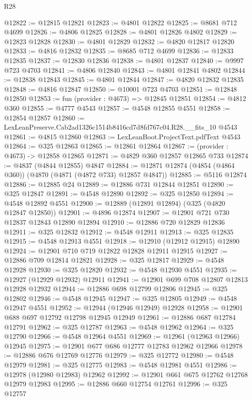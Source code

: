 \begin{lexlean}{R28}
\begin{coremodule}
@12822 := @12815 @12821
@12823 := @4801 @12822
@12825 := @8681 @712 @4699
@12826 := @4806 @12825
@12828 := @4801 @12826 @4802
@12829 := @12823 @12828
@12830 := @4801 @12829
@12832 := @4820 @12817 @12820
@12833 := @4816 @12832
@12835 := @8685 @712 @4699
@12836 := @12833 @12835
@12837 := @12830 @12836
@12838 := @4801 @12837
@12840 := @9997 @723 @4703
@12841 := @4806 @12840
@12843 := @4801 @12841 @4802
@12844 := @12838 @12843
@12845 := @4801 @12844
@12847 := @4820 @12832 @12835
@12848 := @4816 @12847
@12850 := @10001 @723 @4703
@12851 := @12848 @12850
@12853 := fun (provider : @4673) => @12845 @12851
@12854 := @4812 @360
@12855 := @4777 @4543
@12857 := @4548 @12855 @4551
@12858 := @12854 @12857
@12860 := LexLeanPreserve.Cab2ad1326c1514b8416cd7d8fd767c04.R28.__fits_10 @4543
@12861 := @4815 @12860
@12863 := LexLeanBoot.ProjectText.pdfText @4543
@12864 := @325 @12863
@12865 := @12861 @12864
@12867 := (provider : @4673) -> @12858 @12865
@12871 := @4829 @360 @12857 @12865 @733
@12874 := @4837 (@4844 @12855) @4847
@12884 := @12871 @12874 (@4854 (@4864 @360)) (@4870 (@4871 (@4872 @733) @12857 @4847))
@12885 := @5116 @12874
@12886 := @12885 @24
@12889 := @12886 @731 @12844 @12851
@12890 := @325 @12847
@12891 := @4548 @12890
@12892 := @325 @12850
@12894 := @4548 @12892 @4551
@12900 := @12889 (@12891 @12894) (@325 (@4820 @12847 @12850))
@12901 := @4896 @12874
@12907 := @12901 @721 @730 @12837 @12843 @12890 @12894
@12910 := @12886 @720 @12829 @12836
@12911 := @325 @12832
@12912 := @4548 @12911
@12913 := @325 @12835
@12915 := @4548 @12913 @4551
@12918 := @12910 (@12912 @12915) @12890
@12924 := @12901 @710 @719 @12822 @12828 @12911 @12915
@12927 := @12886 @709 @12814 @12821
@12928 := @325 @12817
@12929 := @4548 @12928
@12930 := @325 @12820
@12932 := @4548 @12930 @4551
@12935 := @12927 (@12929 @12932) @12911
@12941 := @12901 @699 @708 @12807 @12813 @12928 @12932
@12944 := @12886 @698 @12799 @12806
@12945 := @325 @12802
@12946 := @4548 @12945
@12947 := @325 @12805
@12949 := @4548 @12947 @4551
@12952 := @12944 (@12946 @12949) @12928
@12958 := @12901 @688 @697 @12792 @12798 @12945 @12949
@12961 := @12886 @687 @12784 @12791
@12962 := @325 @12787
@12963 := @4548 @12962
@12964 := @325 @12790
@12966 := @4548 @12964 @4551
@12969 := @12961 (@12963 @12966) @12945
@12975 := @12901 @677 @686 @12777 @12783 @12962 @12966
@12978 := @12886 @676 @12769 @12776
@12979 := @325 @12772
@12980 := @4548 @12979
@12981 := @325 @12775
@12983 := @4548 @12981 @4551
@12986 := @12978 (@12980 @12983) @12962
@12992 := @12901 @661 @675 @12762 @12768 @12979 @12983
@12995 := @12886 @660 @12754 @12761
@12996 := @325 @12757

\end{coremodule}
\end{lexlean}
